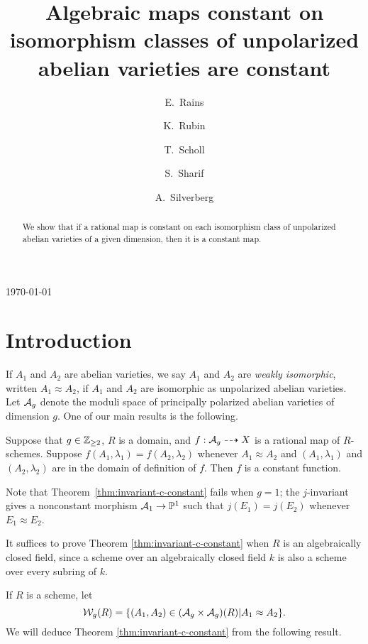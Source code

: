 \documentclass{amsart}
\title[Algebraic maps constant on unpolarized isomorphism classes]{Algebraic maps constant on isomorphism classes of unpolarized abelian varieties are constant}
\author[E.\ Rains]{E.\ Rains}
\author[K.\ Rubin]{K.\ Rubin}
\author[T.\ Scholl]{T.\ Scholl}
\author[S.\ Sharif]{S.\ Sharif}
\author[A.\ Silverberg]{A.\ Silverberg}
\begin{document}
\begin{abstract}
We show that if a %
rational map is constant on each isomorphism class of unpolarized abelian varieties of a given dimension, then it is a constant map. 
\end{abstract}


\today
\maketitle



\section{Introduction}
\label{sec:introduction}

If $A_1$ and $A_2$ are abelian varieties, we say $A_1$ and $A_2$ are \emph{weakly isomorphic}, written $A_1 \approx A_2$, if $A_1$ and $A_2$ are isomorphic as unpolarized abelian varieties. Let $\mathcal{A}_g$ denote the moduli space of principally polarized abelian varieties of dimension $g$. One of our main results is the following.
\begin{theorem}\label{thm:invariant-c-constant}
  Suppose that $g\in\mathbb{Z}_{\ge 2}$, $R$ is a domain, and $f: \mathcal{A}_g \dashrightarrow X$ is a rational map of $R$-schemes. Suppose $f(A_1,\lambda_1) = f(A_2,\lambda_2)$ whenever $A_1 \approx A_2$ and $(A_1,\lambda_1)$ and $(A_2,\lambda_2)$ are in the domain of definition of $f$. Then $f$ is a constant function.
\end{theorem}
Note that Theorem~\ref{thm:invariant-c-constant} fails when $g = 1$; the $j$-invariant gives a nonconstant morphism $\mathcal{A}_1 \to \mathbb{P}^1$ such that $j(E_1) = j(E_2)$ whenever $E_1 \approx E_2$.

It suffices to prove Theorem \ref{thm:invariant-c-constant} when $R$ is an algebraically closed field, since a scheme over an algebraically closed field $k$ is also a scheme over every subring of $k$.




If $R$ is a scheme, let
$$
\mathcal{W}_g(R) = \{(A_1,A_2) \in (\mathcal{A}_g \times \mathcal{A}_g)(R) | A_1 \approx A_2\}.
$$
We will deduce Theorem \ref{thm:invariant-c-constant} from the following result.
\end{document}
